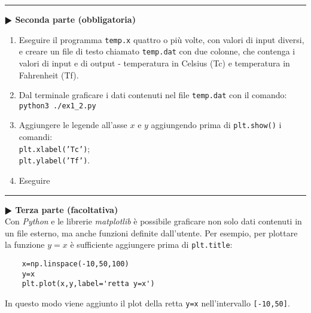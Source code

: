\documentclass[11pt]{article}
\begin{document}
\hrule
\vspace{2mm}
\textbf{$\RHD$ Seconda parte (obbligatoria)} 
%
\begin{enumerate}
\item Eseguire il programma \texttt{temp.x} quattro o pi\`u volte, con valori di input diversi, e creare un file di testo chiamato \texttt{temp.dat} con due colonne,
  che contenga i valori di input e di output - temperatura in Celsius (Tc) e
  temperatura in Fahrenheit (Tf).
\item Dal terminale graficare i dati contenuti nel file \texttt{temp.dat} con il comando:\\
\texttt{python3 ./ex1\_2.py}
\item Aggiungere le legende all'asse $x$ e $y$ aggiungendo prima di \texttt{plt.show()} i comandi:
\\
\texttt{plt.xlabel('Tc')};
\\
\texttt{plt.ylabel('Tf')}.
 \item Eseguire 
 \end{enumerate}


\hrule
\vspace{2mm}\textbf{$\RHD$ Terza parte (facoltativa)\\}
%
Con {\it Python} e le librerie {\it matplotlib} \`e possibile graficare non solo dati contenuti in un file esterno, ma anche funzioni definite dall'utente. Per esempio, 
per plottare la funzione $y=x$ \`e sufficiente aggiungere prima di \texttt{plt.title}: 
\begin{mdframed}[backgroundcolor=gray!10]
  \begin{verbatim}
    x=np.linspace(-10,50,100)
    y=x
    plt.plot(x,y,label='retta y=x')
\end{verbatim}
\end{mdframed}
In questo modo viene aggiunto il plot della retta \texttt{y=x} nell'intervallo \texttt{[-10,50]}. 

\end{document}
